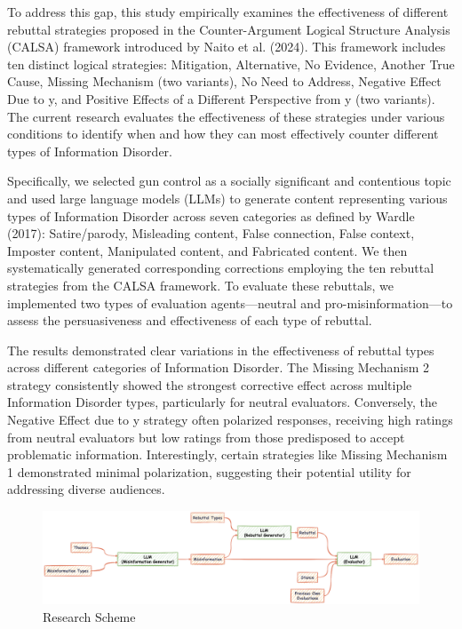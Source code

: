 \documentclass[twocolumn]{article}
\begin{document}
To address this gap, this study empirically examines the effectiveness of different rebuttal strategies proposed in the Counter-Argument Logical Structure Analysis (CALSA) framework introduced by Naito et al. (2024). This framework includes ten distinct logical strategies: Mitigation, Alternative, No Evidence, Another True Cause, Missing Mechanism (two variants), No Need to Address, Negative Effect Due to y, and Positive Effects of a Different Perspective from y (two variants). The current research evaluates the effectiveness of these strategies under various conditions to identify when and how they can most effectively counter different types of Information Disorder.

Specifically, we selected gun control as a socially significant and contentious topic and used large language models (LLMs) to generate content representing various types of Information Disorder across seven categories as defined by Wardle (2017): Satire/parody, Misleading content, False connection, False context, Imposter content, Manipulated content, and Fabricated content. We then systematically generated corresponding corrections employing the ten rebuttal strategies from the CALSA framework. To evaluate these rebuttals, we implemented two types of evaluation agents—neutral and pro-misinformation—to assess the persuasiveness and effectiveness of each type of rebuttal.

The results demonstrated clear variations in the effectiveness of rebuttal types across different categories of Information Disorder. The Missing Mechanism 2 strategy consistently showed the strongest corrective effect across multiple Information Disorder types, particularly for neutral evaluators. Conversely, the Negative Effect due to y strategy often polarized responses, receiving high ratings from neutral evaluators but low ratings from those predisposed to accept problematic information. Interestingly, certain strategies like Missing Mechanism 1 demonstrated minimal polarization, suggesting their potential utility for addressing diverse audiences.

\begin{figure}
    \includegraphics[width=\textwidth]{scheme.png}
    \caption{Research Scheme}
    \label{fig:scheme}
\end{figure}
\end{document}
